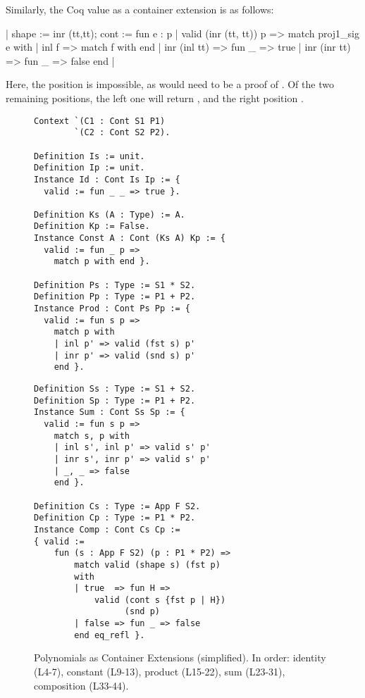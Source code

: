 \documentclass[anonymous, a4paper, UKenglish, cleveref, autoref, thm-restate]{lipics-v2021}
\begin{document}
Similarly, the Coq value  as a container
extension is as follows:
\begin{coqcode}
  {| shape := inr (tt,tt);
     cont := fun e : {p | valid (inr (tt, tt)) p} =>
        match proj1_sig e with
        | inl f => match f with end
        | inr (inl tt) => fun _ => true
        | inr (inr tt) => fun _ => false
        end
  |}
\end{coqcode}
Here, the position  is impossible, as
 would need to be a proof of .
Of the two remaining positions, the left one will return 
, and the right position .
\begin{figure}
\begin{minipage}{.52\textwidth}
  \begin{verbatim}
Context `(C1 : Cont S1 P1) 
        `(C2 : Cont S2 P2).

Definition Is := unit.
Definition Ip := unit.
Instance Id : Cont Is Ip := {
  valid := fun _ _ => true }.

Definition Ks (A : Type) := A.
Definition Kp := False.
Instance Const A : Cont (Ks A) Kp := {
  valid := fun _ p =>
    match p with end }.

Definition Ps : Type := S1 * S2.
Definition Pp : Type := P1 + P2.
Instance Prod : Cont Ps Pp := {
  valid := fun s p => 
    match p with
    | inl p' => valid (fst s) p'
    | inr p' => valid (snd s) p'
    end }.
\end{verbatim}
\end{minipage}
\begin{minipage}{.47\textwidth}
  \begin{verbatim}
Definition Ss : Type := S1 + S2.
Definition Sp : Type := P1 + P2.
Instance Sum : Cont Ss Sp := {
  valid := fun s p => 
    match s, p with
    | inl s', inl p' => valid s' p'
    | inr s', inr p' => valid s' p'
    | _, _ => false
    end }.

Definition Cs : Type := App F S2.
Definition Cp : Type := P1 * P2.
Instance Comp : Cont Cs Cp := 
{ valid :=  
    fun (s : App F S2) (p : P1 * P2) =>
        match valid (shape s) (fst p) 
        with
        | true  => fun H =>
            valid (cont s {fst p | H}) 
                  (snd p)
        | false => fun _ => false
        end eq_refl }.
  \end{verbatim}
\end{minipage}
  \caption{Polynomials as Container Extensions (simplified). In order: identity
  (L4-7), constant (L9-13), product (L15-22), sum (L23-31), composition
  (L33-44).}
  \label{fig:poly}
\end{figure}
\end{document}
